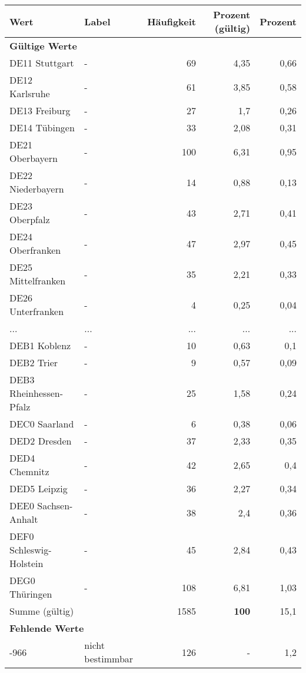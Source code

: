      \begin{longtable}{Xlrrr}
     \toprule
     \textbf{Wert} & \textbf{Label} & \textbf{Häufigkeit} & \textbf{Prozent (gültig)} & \textbf{Prozent} \\
     \endhead
     \midrule
     \multicolumn{5}{l}{\textbf{Gültige Werte}}\\
        \multicolumn{1}{X}{DE11 Stuttgart} & - & 69 & 4,35 & 0,66 \\
        \multicolumn{1}{X}{DE12 Karlsruhe} & - & 61 & 3,85 & 0,58 \\
        \multicolumn{1}{X}{DE13 Freiburg} & - & 27 & 1,7 & 0,26 \\
        \multicolumn{1}{X}{DE14 Tübingen} & - & 33 & 2,08 & 0,31 \\
        \multicolumn{1}{X}{DE21 Oberbayern} & - & 100 & 6,31 & 0,95 \\
        \multicolumn{1}{X}{DE22 Niederbayern} & - & 14 & 0,88 & 0,13 \\
        \multicolumn{1}{X}{DE23 Oberpfalz} & - & 43 & 2,71 & 0,41 \\
        \multicolumn{1}{X}{DE24 Oberfranken} & - & 47 & 2,97 & 0,45 \\
        \multicolumn{1}{X}{DE25 Mittelfranken} & - & 35 & 2,21 & 0,33 \\
        \multicolumn{1}{X}{DE26 Unterfranken} & - & 4 & 0,25 & 0,04 \\
       ... & ... & ... & ... & ... \\
        \multicolumn{1}{X}{DEB1 Koblenz} & - & 10 & 0,63 & 0,1 \\
        \multicolumn{1}{X}{DEB2 Trier} & - & 9 & 0,57 & 0,09 \\
        \multicolumn{1}{X}{DEB3 Rheinhessen-Pfalz} & - & 25 & 1,58 & 0,24 \\
        \multicolumn{1}{X}{DEC0 Saarland} & - & 6 & 0,38 & 0,06 \\
        \multicolumn{1}{X}{DED2 Dresden} & - & 37 & 2,33 & 0,35 \\
        \multicolumn{1}{X}{DED4 Chemnitz} & - & 42 & 2,65 & 0,4 \\
        \multicolumn{1}{X}{DED5 Leipzig} & - & 36 & 2,27 & 0,34 \\
        \multicolumn{1}{X}{DEE0 Sachsen-Anhalt} & - & 38 & 2,4 & 0,36 \\
        \multicolumn{1}{X}{DEF0 Schleswig-Holstein} & - & 45 & 2,84 & 0,43 \\
        \multicolumn{1}{X}{DEG0 Thüringen} & - & 108 & 6,81 & 1,03 \\
     \midrule
      \multicolumn{2}{l}{Summe (gültig)} & 1585 &
      \textbf{100} &
         15,1 \\
     \multicolumn{5}{l}{\textbf{Fehlende Werte}}\\
       -966 & nicht bestimmbar & 126 & - & 1,2 \\


\end{longtable}
